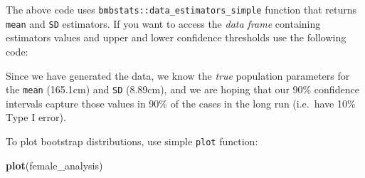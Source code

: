 \documentclass[
]{book}
\newenvironment{Shaded}{\begin{snugshade}}{\end{snugshade}}
\newcommand{\CommentTok}[1]{\textcolor[rgb]{0.56,0.35,0.01}{\textit{#1}}}
\newcommand{\DataTypeTok}[1]{\textcolor[rgb]{0.13,0.29,0.53}{#1}}
\newcommand{\DecValTok}[1]{\textcolor[rgb]{0.00,0.00,0.81}{#1}}
\newcommand{\FloatTok}[1]{\textcolor[rgb]{0.00,0.00,0.81}{#1}}
\newcommand{\KeywordTok}[1]{\textcolor[rgb]{0.13,0.29,0.53}{\textbf{#1}}}
\newcommand{\NormalTok}[1]{#1}
\newcommand{\OperatorTok}[1]{\textcolor[rgb]{0.81,0.36,0.00}{\textbf{#1}}}
\newcommand{\StringTok}[1]{\textcolor[rgb]{0.31,0.60,0.02}{#1}}
\begin{document}
\begin{Shaded}
\end{Shaded}

The above code uses \texttt{bmbstats::data\_estimators\_simple} function that returns \texttt{mean} and \texttt{SD} estimators. If you want to access the \emph{data frame} containing estimators values and upper and lower confidence thresholds use the following code:

\begin{Shaded}
\end{Shaded}

Since we have generated the data, we know the \emph{true} population parameters for the \texttt{mean} (165.1cm) and \texttt{SD} (8.89cm), and we are hoping that our 90\% confidence intervals capture those values in 90\% of the cases in the long run (i.e.~have 10\% Type I error).

To plot bootstrap distributions, use simple \texttt{plot} function:

\begin{Shaded}
\begin{Highlighting}[]
\KeywordTok{plot}\NormalTok{(female\_analysis)}
\end{Highlighting}
\end{Shaded}
\end{document}
